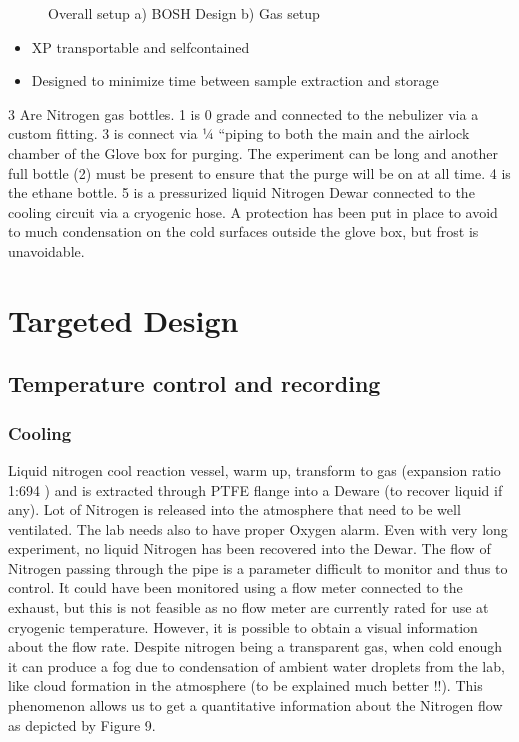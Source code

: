 \documentclass[letterpaper,10pt,english]{jupyterBook}
\begin{document}
\begin{figure}[htbp]
\centering
\capstart

\noindent{}
\caption{Overall setup a) BOSH Design b) Gas setup}\label{\detokenize{Chapter7/Chapter7:id1}}\end{figure}
\begin{itemize}
\item {} 
\sphinxAtStartPar
XP transportable and self\sphinxhyphen{}contained

\item {} 
\sphinxAtStartPar
Designed to minimize time between sample extraction and storage

\end{itemize}

 \sphinxhyphen{}3 Are Nitrogen gas bottles. 1 is 0 grade and connected to the nebulizer via a custom fitting. 3 is connect via ¼ “piping to both the main and the airlock chamber of the Glove box for purging. The experiment can be long and another full bottle (2) must be present to ensure that the purge will be on at all time. 4 is the ethane bottle. 5 is a pressurized liquid Nitrogen Dewar connected to the cooling circuit via a cryogenic hose. A protection has been put in place to avoid to much condensation on the cold surfaces outside the glove box, but frost is unavoidable.


\section{Targeted Design}
\label{\detokenize{Chapter7/Chapter7:targeted-design}}

\subsection{Temperature control and recording}
\label{\detokenize{Chapter7/Chapter7:temperature-control-and-recording}}

\subsubsection{Cooling}
\label{\detokenize{Chapter7/Chapter7:cooling}}
\sphinxAtStartPar
Liquid nitrogen cool reaction vessel, warm up, transform to gas (expansion ratio 1:694 ) and is extracted through PTFE flange into a Deware (to recover liquid if any). Lot of Nitrogen is released into the atmosphere that need to be well ventilated. The lab needs also to have proper Oxygen alarm. Even with very long experiment, no liquid Nitrogen has been recovered into the Dewar.
The flow of Nitrogen passing through the pipe is a parameter difficult to monitor and thus to control. It could have been monitored using a flow meter connected to the exhaust, but this is not feasible as no flow meter are currently rated for use at cryogenic temperature. However, it is possible to obtain a visual information about the flow rate. Despite nitrogen being a transparent gas, when cold enough it can produce a fog due to condensation of ambient water droplets from the lab, like cloud formation in the atmosphere (to be explained much better !!).
This phenomenon allows us to get a quantitative information about the Nitrogen flow as depicted by Figure 9.
\end{document}
